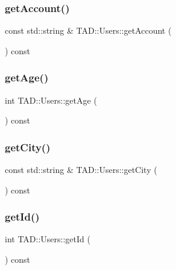 \subsubsection{\texorpdfstring{get\+Account()}{getAccount()}}
{\footnotesize\ttfamily const std\+::string \& T\+A\+D\+::\+Users\+::get\+Account (\begin{DoxyParamCaption}{ }\end{DoxyParamCaption}) const}

\mbox{\label{class_t_a_d_1_1_users_a00ebe0f9d035097f82c37164c9dc5c6e}} 
\subsubsection{\texorpdfstring{get\+Age()}{getAge()}}
{\footnotesize\ttfamily int T\+A\+D\+::\+Users\+::get\+Age (\begin{DoxyParamCaption}{ }\end{DoxyParamCaption}) const}

\mbox{\label{class_t_a_d_1_1_users_a67bf3bdf5e4030e59f136d8b29ea7cfa}} 
\subsubsection{\texorpdfstring{get\+City()}{getCity()}}
{\footnotesize\ttfamily const std\+::string \& T\+A\+D\+::\+Users\+::get\+City (\begin{DoxyParamCaption}{ }\end{DoxyParamCaption}) const}

\mbox{\label{class_t_a_d_1_1_users_a98ba431328ee1a9eb6fe502ddfe6ccc7}} 
\subsubsection{\texorpdfstring{get\+Id()}{getId()}}
{\footnotesize\ttfamily int T\+A\+D\+::\+Users\+::get\+Id (\begin{DoxyParamCaption}{ }\end{DoxyParamCaption}) const}

